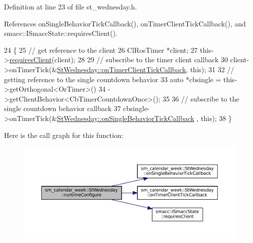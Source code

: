 Definition at line 23 of file st\+\_\+wednesday.\+h.



References on\+Single\+Behavior\+Tick\+Callback(), on\+Timer\+Client\+Tick\+Callback(), and smacc\+::\+I\+Smacc\+State\+::requires\+Client().


\begin{DoxyCode}
24     \{
25         \textcolor{comment}{// get reference to the client}
26         ClRosTimer *client;
27         this->\hyperlink{classsmacc_1_1ISmaccState_a7f95c9f0a6ea2d6f18d1aec0519de4ac}{requiresClient}(client);
28 
29         \textcolor{comment}{// subscribe to the timer client callback}
30         client->onTimerTick(&\hyperlink{structsm__calendar__week_1_1StWednesday_a1ee9efe65b63cb472eaaf7c49f072ebc}{StWednesday::onTimerClientTickCallback}, \textcolor{keyword}{
      this});
31 
32         \textcolor{comment}{// getting reference to the single countdown behavior}
33         \textcolor{keyword}{auto} *cbsingle = this->getOrthogonal<OrTimer>()
34                              ->getClientBehavior<CbTimerCountdownOnce>();
35 
36         \textcolor{comment}{// subscribe to the single countdown behavior callback}
37         cbsingle->onTimerTick(&\hyperlink{structsm__calendar__week_1_1StWednesday_ac7c04230cbb805c53a779f2fa2ca213b}{StWednesday::onSingleBehaviorTickCallback}
      , \textcolor{keyword}{this});
38     \}
\end{DoxyCode}
Here is the call graph for this function\+:
\nopagebreak
\begin{figure}[H]
\begin{center}
\leavevmode
\includegraphics[width=350pt]{structsm__calendar__week_1_1StWednesday_a5f47539c7bdbfaa8c808b5045e95444c_cgraph}
\end{center}
\end{figure}
\mbox{\label{structsm__calendar__week_1_1StWednesday_a5e641d0acc42524bac18647f6ab02278}} 
